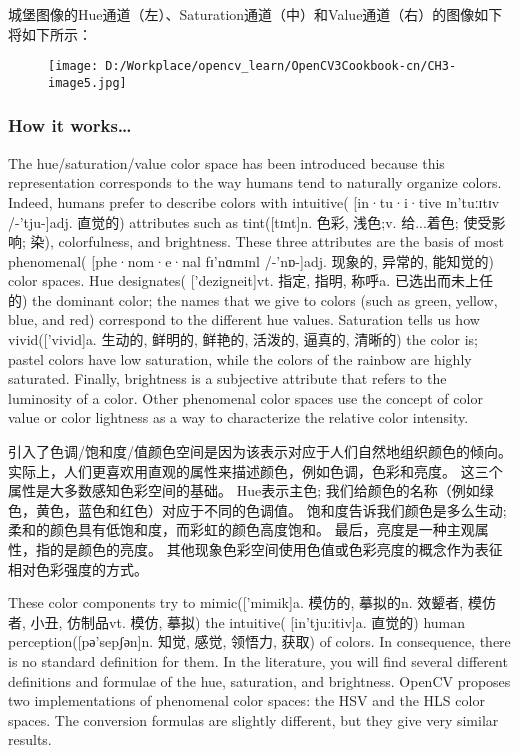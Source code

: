 \documentclass[]{article}
\begin{document}
城堡图像的Hue通道（左）、Saturation通道（中）和Value通道（右）的图像如下将如下所示：

\begin{figure}
\centering
\texttt{[image: D:/Workplace/opencv\_learn/OpenCV3Cookbook-cn/CH3-image5.jpg]}
\caption{}
\end{figure}

\hypertarget{header-n1388}{%
\subsubsection{How it works\ldots{}}\label{header-n1388}}

The hue/saturation/value color space has been introduced because this
representation corresponds to the way humans tend to naturally organize
colors. Indeed, humans prefer to describe colors with intuitive(
{[}in·tu·i·tive \textbar{}\textbar{} ɪn'tuːɪtɪv /-'tju-{]}adj. 直觉的)
attributes such as tint({[}tɪnt{]}n. 色彩, 浅色;v. 给...着色; 使受影响;
染), colorfulness, and brightness. These three attributes are the basis
of most phenomenal( {[}phe·nom·e·nal \textbar{}\textbar{} fɪ'nɑmɪnl
/-'nɒ-{]}adj. 现象的, 异常的, 能知觉的) color spaces. Hue designates(
{[}'dezigneit{]}vt. 指定, 指明, 称呼a. 已选出而未上任的) the dominant
color; the names that we give to colors (such as green, yellow, blue,
and red) correspond to the different hue values. Saturation tells us how
vivid({[}'vivid{]}a. 生动的, 鲜明的, 鲜艳的, 活泼的, 逼真的, 清晰的) the
color is; pastel colors have low saturation, while the colors of the
rainbow are highly saturated. Finally, brightness is a subjective
attribute that refers to the luminosity of a color. Other phenomenal
color spaces use the concept of color value or color lightness as a way
to characterize the relative color intensity.

引入了色调/饱和度/值颜色空间是因为该表示对应于人们自然地组织颜色的倾向。
实际上，人们更喜欢用直观的属性来描述颜色，例如色调，色彩和亮度。
这三个属性是大多数感知色彩空间的基础。 Hue表示主色;
我们给颜色的名称（例如绿色，黄色，蓝色和红色）对应于不同的色调值。
饱和度告诉我们颜色是多么生动;
柔和的颜色具有低饱和度，而彩虹的颜色高度饱和。
最后，亮度是一种主观属性，指的是颜色的亮度。
其他现象色彩空间使用色值或色彩亮度的概念作为表征相对色彩强度的方式。

These color components try to mimic({[}'mimik{]}a. 模仿的, 摹拟的n.
效颦者, 模仿者, 小丑, 仿制品vt. 模仿, 摹拟) the intuitive(
{[}in'tju:itiv{]}a. 直觉的) human perception({[}pә'sepʃәn{]}n. 知觉,
感觉, 领悟力, 获取) of colors. In consequence, there is no standard
definition for them. In the literature, you will find several different
definitions and formulae of the hue, saturation, and brightness. OpenCV
proposes two implementations of phenomenal color spaces: the HSV and the
HLS color spaces. The conversion formulas are slightly different, but
they give very similar results.
\end{document}
